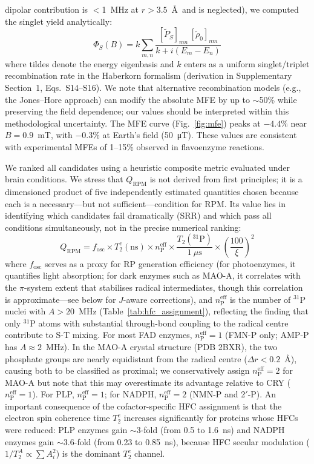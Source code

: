 \documentclass[11pt]{article}
\begin{document}
dipolar contribution is $<$1~MHz at $r > 3.5$~\AA\ and is neglected), we computed the singlet yield analytically:
\begin{equation}
\Phi_S(B) = k\sum_{m,n} \frac{[\tilde{P}_S]_{mn}\,[\tilde{\rho}_0]_{nm}}{k + i(E_m - E_n)}
\label{eq:PhiS}
\end{equation}
where tildes denote the energy eigenbasis and $k$ enters as a uniform singlet/triplet recombination rate in the Haberkorn formalism\cite{Haberkorn1976} (derivation in Supplementary Section~1, Eqs.~S14--S16). We note that alternative recombination models (e.g., the Jones--Hore approach) can modify the absolute MFE by up to $\sim$50\% while preserving the field dependence\cite{Jones2009}; our values should be interpreted within this methodological uncertainty. The MFE curve (Fig.~\ref{fig:mfe}) peaks at $-4.4\%$ near $B = 0.9$~mT, with $-0.3\%$ at Earth's field (50~\si{\micro\tesla}). These values are consistent with experimental MFEs of 1--15\% observed in flavoenzyme reactions\cite{Maeda2012}.

We ranked all candidates using a heuristic composite metric evaluated under brain conditions. We stress that $Q_\mathrm{RPM}$ is not derived from first principles; it is a dimensioned product of five independently estimated quantities chosen because each is a necessary---but not sufficient---condition for RPM. Its value lies in identifying which candidates fail dramatically (SRR) and which pass all conditions simultaneously, not in the precise numerical ranking:
\begin{equation}
Q_\mathrm{RPM} = f_\mathrm{osc} \times T_2^e(\mathrm{ns}) \times n_\mathrm{P}^\mathrm{eff} \times \frac{T_2(^{31}\mathrm{P})}{1~\mu\mathrm{s}} \times \left(\frac{100}{\xi}\right)^2
\label{eq:Q}
\end{equation}
where $f_\mathrm{osc}$ serves as a proxy for RP generation efficiency (for photoenzymes, it quantifies light absorption; for dark enzymes such as MAO-A, it correlates with the $\pi$-system extent that stabilises radical intermediates, though this correlation is approximate---see below for $J$-aware corrections), and $n_\mathrm{P}^\mathrm{eff}$ is the number of $^{31}$P nuclei with $A > 20$~MHz (Table~\ref{tab:hfc_assignment}), reflecting the finding that only $^{31}$P atoms with substantial through-bond coupling to the radical centre contribute to S-T mixing. For most FAD enzymes, $n_\mathrm{P}^\mathrm{eff} = 1$ (FMN-P only; AMP-P has $A \approx 2$~MHz). In the MAO-A crystal structure (PDB 2BXR), the two phosphate groups are nearly equidistant from the radical centre ($\Delta r < 0.2$~\AA), causing both to be classified as proximal; we conservatively assign $n_\mathrm{P}^\mathrm{eff} = 2$ for MAO-A but note that this may overestimate its advantage relative to CRY ($n_\mathrm{P}^\mathrm{eff} = 1$). For PLP, $n_\mathrm{P}^\mathrm{eff} = 1$; for NADPH, $n_\mathrm{P}^\mathrm{eff} = 2$ (NMN-P and 2$'$-P). An important consequence of the cofactor-specific HFC assignment is that the electron spin coherence time $T_2^e$ increases significantly for proteins whose HFCs were reduced: PLP enzymes gain $\sim$3-fold (from 0.5 to 1.6~ns) and NADPH enzymes gain $\sim$3.6-fold (from 0.23 to 0.85~ns), because HFC secular modulation ($1/T_2^A \propto \sum A_i^2$) is the dominant $T_2^e$ channel.
\end{document}
